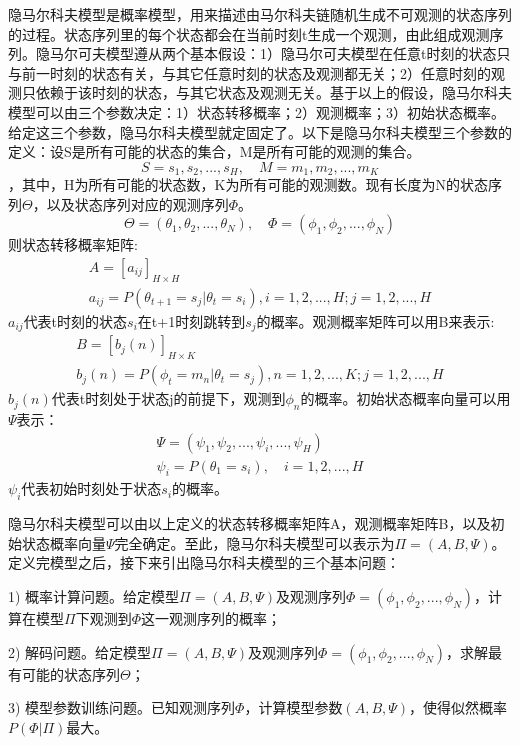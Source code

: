 隐马尔科夫模型是概率模型，用来描述由马尔科夫链随机生成不可观测的状态序列的过程。状态序列里的每个状态都会在当前时刻t生成一个观测，由此组成观测序列。隐马尔可夫模型遵从两个基本假设：1）隐马尔可夫模型在任意t时刻的状态只与前一时刻的状态有关，与其它任意时刻的状态及观测都无关；2）任意时刻的观测只依赖于该时刻的状态，与其它状态及观测无关。基于以上的假设，隐马尔科夫模型可以由三个参数决定：1）状态转移概率；2）观测概率；3）初始状态概率。给定这三个参数，隐马尔科夫模型就定固定了。以下是隐马尔科夫模型三个参数的定义：设S是所有可能的状态的集合，M是所有可能的观测的集合。$$S={s_1,s_2,...,s_H}, \quad M={m_1,m_2,...,m_K}$$，其中，H为所有可能的状态数，K为所有可能的观测数。现有长度为N的状态序列$\Theta$，以及状态序列对应的观测序列$\Phi$。$$\Theta=(\theta_1,\theta_2,...,\theta_N), \quad \Phi=(\phi_1,\phi_2,...,\phi_N)$$则状态转移概率矩阵:
\begin{eqnarray}
  A=[a_{ij}]_{H\times H} \\
  a_{ij} = P(\theta_{t+1}=s_j | \theta_t=s_i), i=1,2,...,H; j=1,2,...,H
\end{eqnarray}
$a_{ij}$代表t时刻的状态$s_i$在t+1时刻跳转到$s_j$的概率。观测概率矩阵可以用B来表示:
\begin{eqnarray}
  B=[b_j(n)]_{H\times K} \\
  b_j(n) = P(\phi_t=m_n | \theta_t=s_j), n=1,2,...,K; j=1,2,...,H
\end{eqnarray}
$b_j(n)$代表t时刻处于状态j的前提下，观测到$\phi_n$的概率。初始状态概率向量可以用$\Psi$表示：
\begin{eqnarray}
  \Psi=(\psi_1,\psi_2,...,\psi_i,...,\psi_H) \\
  \psi_i = P(\theta_1=s_i), \quad i=1,2,...,H
\end{eqnarray}
$\psi_i$代表初始时刻处于状态$s_i$的概率。

隐马尔科夫模型可以由以上定义的状态转移概率矩阵A，观测概率矩阵B，以及初始状态概率向量$\Psi$完全确定。至此，隐马尔科夫模型可以表示为$\Pi=(A,B,\Psi)$。定义完模型之后，接下来引出隐马尔科夫模型的三个基本问题：

1) 概率计算问题。给定模型$\Pi=(A,B,\Psi)$及观测序列$\Phi=(\phi_1,\phi_2,...,\phi_N)$，计算在模型$\Pi$下观测到$\Phi$这一观测序列的概率；

2) 解码问题。给定模型$\Pi=(A,B,\Psi)$及观测序列$\Phi=(\phi_1,\phi_2,...,\phi_N)$，求解最有可能的状态序列$\Theta$；

3) 模型参数训练问题。已知观测序列$\Phi$，计算模型参数$(A,B,\Psi)$，使得似然概率$P(\Phi|\Pi)$最大。

